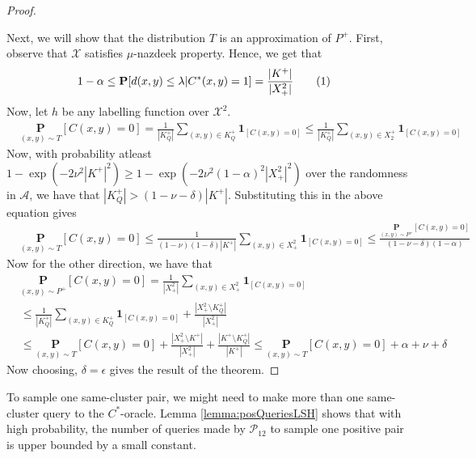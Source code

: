 \documentclass[12pt]{article}
\newcommand{\mb}{\mathbf}
\newcommand{\mc}{\mathcal}
\newcommand\numberthis{\addtocounter{equation}{1}\tag{\theequation}}
\begin{document}
\begin{proof}
\begin{enumerate}[noitemsep,label=\textbf{S.\arabic*}]
\end{enumerate}
Next, we will show that the distribution $T$ is an approximation of $P^+$. First, observe that $\mc X$ satisfies $\mu$-nazdeek property. Hence, we get that 
\begin{align*}
  &1 - \alpha \le \mb P[d(x, y) \le \lambda| C^*(x, y) = 1] = \frac{|K^+|}{|X^2_+|} \numberthis\label{eqn:KplusX2plus}
\end{align*}
Now, let $h$ be any labelling function over $\mc X^2$.
\begin{align*}
  &\underset{(x, y) \sim T}{\mb P} [C(x, y) = 0] = \frac{1}{|K_Q^+|}\sum_{(x, y) \in K^+_Q} \mb 1_{[C(x, y) = 0]} \le \frac{1}{|K_Q^+|}\sum_{(x, y) \in X^+_2} \mb 1_{[C(x, y) = 0]}
\end{align*}
Now, with probability atleast $1- \exp(-2\nu^2 |K^+|^2) \ge 1- \exp(-2\nu^2 (1-\alpha)^2|X^2_+|^2)$ over the randomness in $\mc A$, we have that $|K_Q^+| > (1-\nu - \delta)|K^+|$. Substituting this in the above equation gives
\begin{align*}
  &\underset{(x, y) \sim T}{\mb P} [C(x, y) = 0]  \le \frac{1}{(1-\nu)(1-\delta)|K^+|}\sum_{(x, y) \in X^2_+} \mb 1_{[C(x, y) = 0]} \le \frac{\underset{(x, y) \sim P^+}{\mb P} [C(x, y) = 0]}{(1-\nu -\delta)(1-\alpha)}
\end{align*}
Now for the other direction, we have that
\begin{align*}
  &\underset{(x, y) \sim P^+}{\mb P} [C(x, y) = 0] = \frac{1}{|X_+^2|}\sum_{(x, y) \in X^2_+} \mb 1_{[C(x, y) = 0]}\\
  &\le \frac{1}{|K_Q^+|}\sum_{(x, y) \in K^+_Q} \mb 1_{[C(x, y) = 0]} + \frac{|X^2_+ \setminus K^+_Q|}{|X_+^2|} \\
  &\le \underset{(x, y) \sim T}{\mb P} [C(x, y) = 0] + \frac{|X^2_+ \setminus K^+|}{|X_+^2|} + \frac{|K^+ \setminus K^+_Q|}{|K^+|} \le \underset{(x, y) \sim T}{\mb P} [C(x, y) = 0] + \alpha + \nu + \delta
\end{align*}
Now choosing, $\delta = \epsilon$ gives the result of the theorem.
\end{proof}

To sample one same-cluster pair, we might need to make more than one same-cluster query to the $C^*$-oracle. Lemma \ref{lemma:posQueriesLSH} shows that with high probability, the number of queries made by $\mc P_{12}$ to sample one positive pair is upper bounded by a small constant. 
\end{document}
